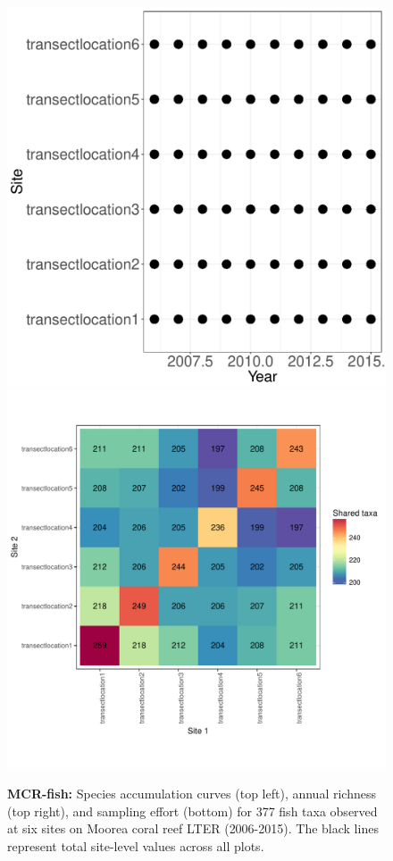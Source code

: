 \documentclass[11pt, oneside]{article}
\begin{document}
\begin{figure}[h!]
\includegraphics[scale = 0.4]{mcr-fish-castorani_spatiotemporal_sampling_effort.pdf}
\includegraphics[scale = 0.4]{mcr-fish-castorani_spp_shared.pdf}
\caption{{\bf MCR-fish:} Species accumulation curves (top left),  annual richness (top right), and sampling effort (bottom)  for 377 fish taxa observed at six sites on Moorea coral reef LTER (2006-2015). The black lines represent total site-level values across all plots.}
\label{mcr-fish}
\end{figure}
\end{document}
